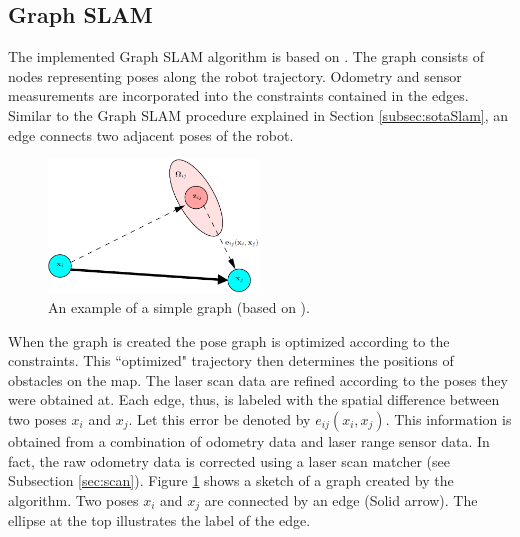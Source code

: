 \documentclass{ba-kecs}
\begin{document}
\subsection{Graph SLAM}
\label{sec:implSLAM}
The implemented Graph SLAM algorithm is based on \citep{Grisetti}. The graph consists of nodes representing poses along the robot trajectory. Odometry and sensor measurements are incorporated into the constraints contained in the edges. Similar to the Graph SLAM procedure explained in Section \ref{subsec:sotaSlam}, an edge connects two adjacent poses of the robot. 
\begin{figure}[h]
	\centering
		\includegraphics[width=0.50\textwidth]{figures/graph.png}
	\caption{An example of a simple graph (based on \citep{Grisetti}).}
	\label{fig:turtlebotexample_graph}
\end{figure}
When the graph is created the pose graph is optimized according to the constraints. This ``optimized" trajectory then determines the positions of obstacles on the map. The laser scan data are refined according to the poses they were obtained at. Each edge, thus, is labeled with the spatial difference between two poses \(x_i\) and \(x_j\). Let this error be denoted by \(e_{ij}(x_i, x_j)\). This information is obtained from a combination of odometry data and laser range sensor data. In fact, the raw odometry data is corrected using a laser scan matcher (see Subsection \ref{sec:scan}). 
Figure \ref{fig:turtlebotexample_graph} shows a sketch of a graph created by the algorithm. Two poses \(x_i\) and \(x_j\) are connected by an edge (Solid arrow). The ellipse at the top illustrates the label of the edge.
\end{document}
